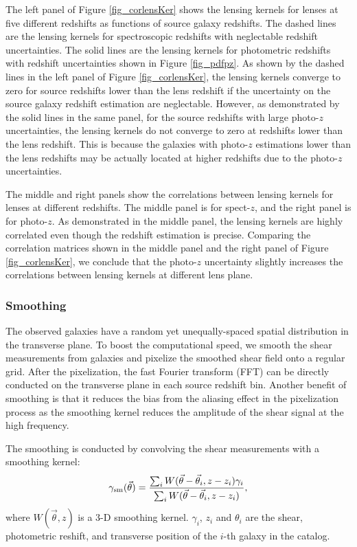 \documentclass[twocolumn]{aastex63}
\begin{document}
The left panel of Figure \ref{fig_corlensKer} shows the lensing kernels for
lenses at five different redshifts as functions of source galaxy redshifts.
The dashed lines are the lensing kernels for spectroscopic redshifts with
neglectable redshift uncertainties. The solid lines are the lensing kernels for
photometric redshifts with redshift uncertainties shown in Figure
\ref{fig_pdfpz}. As shown by the dashed lines in the left panel of Figure
\ref{fig_corlensKer}, the lensing kernels converge to zero for source redshifts
lower than the lens redshift if the uncertainty on the source galaxy
redshift estimation are neglectable. However, as demonstrated by the solid
lines in the same panel, for the source redshifts with large photo-$z$
uncertainties, the lensing kernels do not converge to zero at redshifts lower
than the lens redshift. This is because the galaxies with photo-$z$ estimations
lower than the lens redshifts may be actually located at higher redshifts due
to the photo-$z$ uncertainties.

The middle and right panels show the correlations between lensing kernels for
lenses at different redshifts. The middle panel is for spect-$z$, and the right
panel is for photo-$z$. As demonstrated in the middle panel, the lensing
kernels are highly correlated even though the redshift estimation is precise.
Comparing the correlation matrices shown in the middle panel and the right
panel of Figure \ref{fig_corlensKer}, we conclude that the photo-$z$
uncertainty slightly increases the correlations between lensing kernels at
different lens plane.

\subsubsection{Smoothing}
\label{subsec_method_smoothing}

The observed galaxies have a random yet unequally-spaced spatial distribution
in the transverse plane. To boost the computational speed, we smooth the shear
measurements from galaxies and pixelize the smoothed shear field onto a regular
grid. After the pixelization, the fast Fourier transform (FFT) can be directly
conducted on the transverse plane in each source redshift bin.  Another benefit
of smoothing is that it reduces the bias from the aliasing effect in the
pixelization process as the smoothing kernel reduces the amplitude of the shear
signal at the high frequency.

The smoothing is conducted by convolving the shear measurements with a
smoothing kernel:
\begin{equation}
\gamma_{\rm{sm}} (\vec{\theta})  = \frac{\sum_i
W(\vec{\theta}-\vec{{\theta}}_i,z-z_i) \gamma_i}{\sum_i
W(\vec{\theta}-\vec{{\theta}}_i,z-z_i) },
\end{equation}
where $W(\vec{\theta},z)$ is a $3$-D smoothing kernel. $\gamma_i$, $z_i$ and
$\theta_i$ are the shear, photometric reshift, and transverse position of the
$i$-th galaxy in the catalog.
\end{document}
